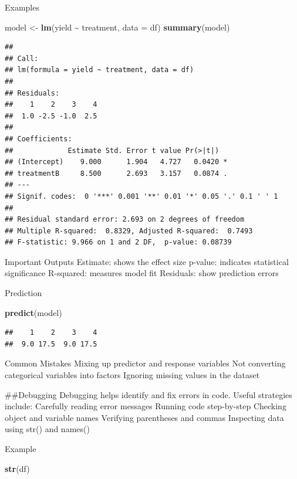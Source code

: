 \documentclass[
]{article}
\newenvironment{Shaded}{\begin{snugshade}}{\end{snugshade}}
\newcommand{\AttributeTok}[1]{\textcolor[rgb]{0.13,0.29,0.53}{#1}}
\newcommand{\FunctionTok}[1]{\textcolor[rgb]{0.13,0.29,0.53}{\textbf{#1}}}
\newcommand{\NormalTok}[1]{#1}
\newcommand{\OtherTok}[1]{\textcolor[rgb]{0.56,0.35,0.01}{#1}}
\newcommand{\SpecialCharTok}[1]{\textcolor[rgb]{0.81,0.36,0.00}{\textbf{#1}}}
\begin{document}
Examples

\begin{Shaded}
\begin{Highlighting}[]
\NormalTok{model }\OtherTok{\textless{}{-}} \FunctionTok{lm}\NormalTok{(yield }\SpecialCharTok{\textasciitilde{}}\NormalTok{ treatment, }\AttributeTok{data =}\NormalTok{ df)}
\FunctionTok{summary}\NormalTok{(model)}
\end{Highlighting}
\end{Shaded}

\begin{verbatim}
## 
## Call:
## lm(formula = yield ~ treatment, data = df)
## 
## Residuals:
##    1    2    3    4 
##  1.0 -2.5 -1.0  2.5 
## 
## Coefficients:
##             Estimate Std. Error t value Pr(>|t|)  
## (Intercept)    9.000      1.904   4.727   0.0420 *
## treatmentB     8.500      2.693   3.157   0.0874 .
## ---
## Signif. codes:  0 '***' 0.001 '**' 0.01 '*' 0.05 '.' 0.1 ' ' 1
## 
## Residual standard error: 2.693 on 2 degrees of freedom
## Multiple R-squared:  0.8329, Adjusted R-squared:  0.7493 
## F-statistic: 9.966 on 1 and 2 DF,  p-value: 0.08739
\end{verbatim}

Important Outputs Estimate: shows the effect size p-value: indicates
statistical significance R-squared: measures model fit Residuals: show
prediction errors

Prediction

\begin{Shaded}
\begin{Highlighting}[]
\FunctionTok{predict}\NormalTok{(model)}
\end{Highlighting}
\end{Shaded}

\begin{verbatim}
##    1    2    3    4 
##  9.0 17.5  9.0 17.5
\end{verbatim}

Common Mistakes Mixing up predictor and response variables Not
converting categorical variables into factors Ignoring missing values in
the dataset

\#\#Debugging Debugging helps identify and fix errors in code. Useful
strategies include: Carefully reading error messages Running code
step-by-step Checking object and variable names Verifying parentheses
and commas Inspecting data using str() and names()

Example

\begin{Shaded}
\begin{Highlighting}[]
\FunctionTok{str}\NormalTok{(df)}
\end{Highlighting}
\end{Shaded}
\end{document}
